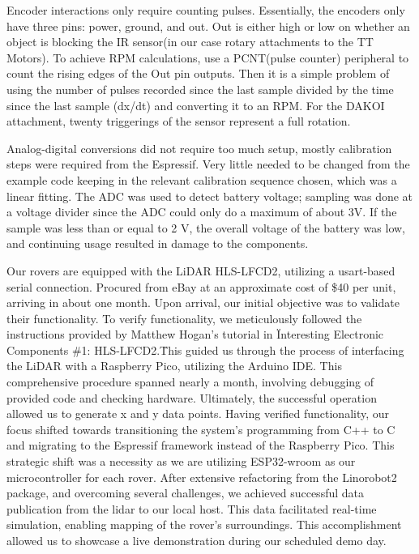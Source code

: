 \documentclass[conference]{IEEEtran}
\begin{document}
 Encoder interactions only require counting pulses. Essentially, the encoders only have three pins: power, ground, and out. Out is either high or low on whether an object is blocking the IR sensor(in our case rotary attachments to the TT Motors). To achieve RPM calculations, use a PCNT(pulse counter) peripheral to count the rising edges of the Out pin outputs. Then it is a simple problem of using the number of pulses recorded since the last sample divided by the time since the last sample (dx/dt) and converting it to an RPM. For the DAKOI attachment, twenty triggerings of the sensor represent a full rotation.
 
 Analog-digital conversions did not require too much setup, mostly calibration steps were required from the Espressif. Very little needed to be changed from the example code keeping in the relevant calibration sequence chosen, which was a linear fitting. The ADC was used to detect battery voltage; sampling was done at a voltage divider since the ADC could only do a maximum of about 3V. If the sample was less than or equal to 2 V, the overall voltage of the battery was low, and continuing usage resulted in damage to the components.
 
 
Our rovers are equipped with the LiDAR HLS-LFCD2, utilizing a usart-based serial connection. Procured from eBay at an approximate cost of \$40 per unit, arriving in about one month. Upon arrival, our initial objective was to validate their functionality.
To verify functionality, we meticulously followed the instructions provided by Matthew Hogan's tutorial in \"Interesting Electronic Components \#1: HLS-LFCD2.\" This guided us through the process of interfacing the LiDAR with a Raspberry Pico, utilizing the Arduino IDE. This comprehensive procedure spanned nearly a month, involving debugging of provided code and checking hardware. Ultimately, the successful operation allowed us to generate x and y data points.
Having verified functionality, our focus shifted towards transitioning the system's programming from C++ to C and migrating to the Espressif framework instead of the Raspberry Pico. This strategic shift was a necessity as we are utilizing ESP32-wroom as our microcontroller for each rover.
After extensive refactoring from the Linorobot2 package, and overcoming several challenges, we achieved successful data publication from the lidar to our local host. This data facilitated real-time simulation, enabling mapping of the rover's surroundings. This accomplishment allowed us to showcase a live demonstration during our scheduled demo day.
\end{document}
